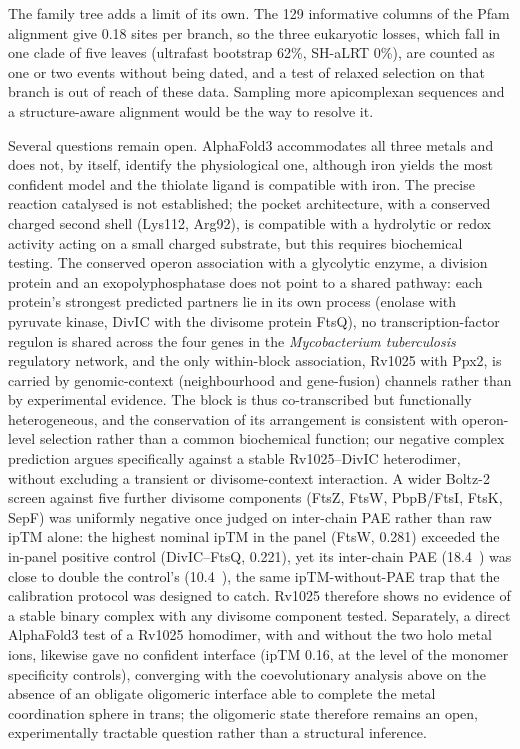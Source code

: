 \documentclass[11pt,a4paper]{article}
\newcommand{\mtb}{\textit{Mycobacterium tuberculosis}}
\newcommand{\ang}{\text{\AA}}
\begin{document}
The family tree adds a limit of its own. The 129 informative columns of the Pfam alignment give 0.18 sites per branch, so the three eukaryotic losses, which fall in one clade of five leaves (ultrafast bootstrap 62\%, SH-aLRT 0\%), are counted as one or two events without being dated, and a test of relaxed selection on that branch is out of reach of these data. Sampling more apicomplexan sequences and a structure-aware alignment would be the way to resolve it.

Several questions remain open. AlphaFold3 accommodates all three metals and does not, by itself, identify the physiological one, although iron yields the most confident model and the thiolate ligand is compatible with iron. The precise reaction catalysed is not established; the pocket architecture, with a conserved charged second shell (Lys112, Arg92), is compatible with a hydrolytic or redox activity acting on a small charged substrate, but this requires biochemical testing. The conserved operon association with a glycolytic enzyme, a division protein and an exopolyphosphatase does not point to a shared pathway: each protein's strongest predicted partners lie in its own process (enolase with pyruvate kinase, DivIC with the divisome protein FtsQ), no transcription-factor regulon is shared across the four genes in the \mtb{} regulatory network, and the only within-block association, Rv1025 with Ppx2, is carried by genomic-context (neighbourhood and gene-fusion) channels rather than by experimental evidence. The block is thus co-transcribed but functionally heterogeneous, and the conservation of its arrangement is consistent with operon-level selection rather than a common biochemical function; our negative complex prediction argues specifically against a stable Rv1025--DivIC heterodimer, without excluding a transient or divisome-context interaction. A wider Boltz-2 screen against five further divisome components (FtsZ, FtsW, PbpB/FtsI, FtsK, SepF) was uniformly negative once judged on inter-chain PAE rather than raw ipTM alone: the highest nominal ipTM in the panel (FtsW, 0.281) exceeded the in-panel positive control (DivIC--FtsQ, 0.221), yet its inter-chain PAE (18.4~\ang{}) was close to double the control's (10.4~\ang{}), the same ipTM-without-PAE trap that the calibration protocol was designed to catch. Rv1025 therefore shows no evidence of a stable binary complex with any divisome component tested. Separately, a direct AlphaFold3 test of a Rv1025 homodimer, with and without the two holo metal ions, likewise gave no confident interface (ipTM 0.16, at the level of the monomer specificity controls), converging with the coevolutionary analysis above on the absence of an obligate oligomeric interface able to complete the metal coordination sphere in trans; the oligomeric state therefore remains an open, experimentally tractable question rather than a structural inference.
\end{document}
